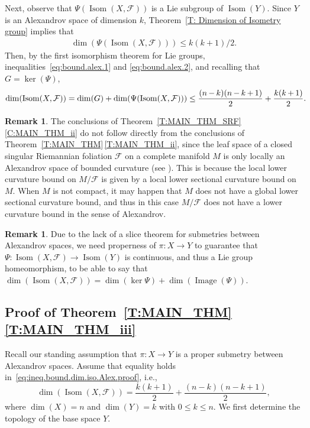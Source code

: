 \documentclass[10pt,a4paper]{amsart}
\numberwithin{equation}{section}
\theoremstyle{definition}
\newtheorem{rem}[thm]{Remark}
\DeclareMathOperator{\Iso}{Isom}
\DeclareMathOperator{\img}{Image}
\newcommand{\fol}{\mathcal{F}}
\begin{document}
Next, observe that $\Psi(\Iso(X,\fol))$ is a Lie subgroup of $\Iso(Y)$. Since $Y$ is an Alexandrov space of dimension $k$, Theorem~\ref{T: Dimension of Isometry group} implies that
\begin{align}\label{eq:bound.alex.2}
\dim(\Psi(\Iso(X,\fol))) \leq k(k+1)/2.
\end{align}
Then, by the first isomorphism theorem for Lie groups, inequalities~\eqref{eq:bound.alex.1} and \eqref{eq:bound.alex.2}, and recalling that $G=\ker(\Psi)$,
\begin{align}
\dim ( \Iso (X,\fol) )  = \dim (G) + \dim (\Psi(\Iso(X,\fol)) ) \leq \frac{(n\hspace{-0.5pt}-\hspace{-0.5pt}k)(n\hspace{-0.5pt}-\hspace{-0.5pt}k\hspace{-0.5pt}+\hspace{-0.5pt}1)}{2} +\frac{k(k\hspace{-0.5pt}+\hspace{-0.5pt}1)}{2}.\!\!\!\label{eq:ineq.bound.dim.iso.Alex.proof}
\end{align}

\begin{rem}
The conclusions of Theorem~\ref{T:MAIN_THM_SRF}\,\ref{C:MAIN_THM_ii} do not follow directly from the conclusions of Theorem~\ref{T:MAIN_THM}\,\ref{T:MAIN_THM_ii}, since the leaf space of a closed singular Riemannian foliation $\fol$ on a complete manifold $M$ is only locally an Alexandrov space of bounded curvature (see \cite[p.~119]{LytchakThorbergsson2010}). This is because the local lower curvature bound on $M/\fol$ is given by a local lower sectional curvature bound on $M$. When $M$ is not compact, it may happen that $M$ does not have a global lower sectional curvature bound, and thus in this case $M/\fol$ does not have a lower curvature bound in the sense of Alexandrov.
\end{rem}

\begin{rem}
Due to the lack of a slice theorem for submetries between Alexandrov spaces, we need properness of $\pi\colon X\to Y$ to guarantee that $\Psi\colon \Iso(X,\fol)\to \Iso(Y)$ is continuous, and thus a Lie group homeomorphism, to be able to say that $\dim(\Iso(X,\fol))=\dim(\ker\Psi)+\dim(\img(\Psi))$.
\end{rem}

\subsection[Proof of Theorem B]{Proof of Theorem~\ref{T:MAIN_THM}\,\ref{T:MAIN_THM_iii}}Recall our standing assumption that $\pi\colon X\to Y$ is a proper submetry between Alexandrov spaces.
Assume that equality holds in~\eqref{eq:ineq.bound.dim.iso.Alex.proof}, i.e.,
\[
\dim(\Iso(X,\fol)) = \frac{k(k+1)}{2}+\frac{(n-k)(n-k+1)}{2},
\]	
where $\dim(X) = n$ and $\dim(Y) = k$ with $0\leq k\leq n$. We first determine the topology of the base space $Y$.
\end{document}
